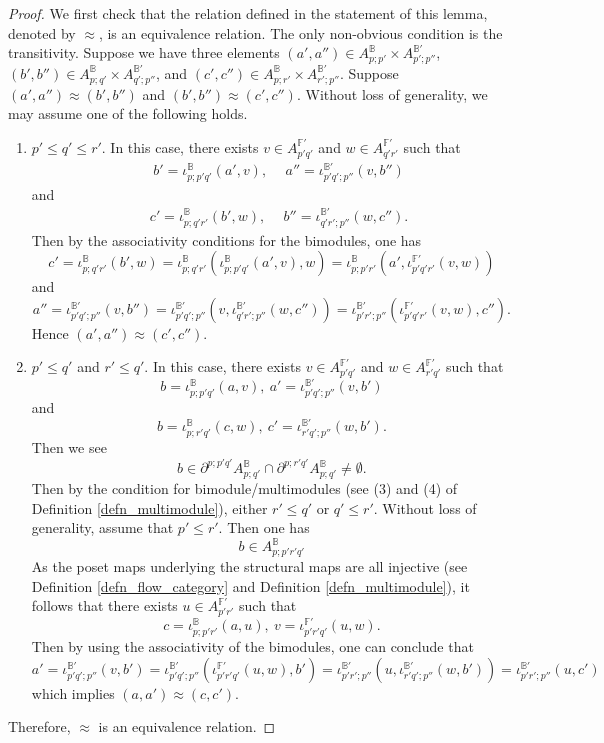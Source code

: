 \documentclass[reqno, 10pt]{amsart}
\numberwithin{equation}{section}
\numberwithin{equation}{section}
\theoremstyle{definition}
\theoremstyle{remark}
\newcommand{\beqn}{\begin{equation*}}
\newcommand{\eeqn}{\end{equation*}}
\newcommand{\mb}{\mathbb}
\begin{document}
\begin{proof}
    
We first check that the relation defined in the statement of this lemma, denoted by $\approx$, is an equivalence relation. The only non-obvious condition is the transitivity. Suppose we have three elements $(a', a'') \in A_{p; p'}^{\mb B} \times A_{p'; p''}^{{\mb B}'}$, $(b', b'') \in A_{p; q'}^{\mb B} \times A_{q'; p''}^{{\mb B}'}$, and $(c', c'') \in A_{p; r'}^{\mb B} \times A_{r'; p''}^{{\mb B}'}$. Suppose $(a', a'') \approx (b', b'')$ and $(b', b'') \approx (c', c'')$. Without loss of generality, we may assume one of the following holds.
\begin{enumerate}

\item $p' \leq q' \leq r'$. In this case, there exists $v \in A_{p' q'}^{{\mb F}'}$ and $w \in A_{q'r'}^{{\mb F}'}$ such that 
\begin{align*}
&\ b' = \iota_{p; p'q'}^{{\mb B}}(a', v),\ &\ a'' = \iota_{p'q'; p''}^{{\mb B}'}(v, b'')
\end{align*}
and 
\begin{align*}
&\ c' = \iota_{p; q'r'}^{{\mb B}}(b', w),\ &\ b'' = \iota_{q'r'; p''}^{{\mb B}'}(w, c'').
\end{align*}
Then by the associativity conditions for the bimodules, one has
\beqn
c' = \iota_{p; q'r'}^{\mb B}(b', w) = \iota_{p; q'r'}^{{\mb B}}(\iota_{p; p'q'}^{{\mb B}}(a', v), w) = \iota_{p; p'r'}^{{\mb B}} (a', \iota_{p'q'r'}^{{\mb F}'}(v, w))
\eeqn
and
\beqn
a'' = \iota_{p'q'; p''}^{{\mb B}'}(v, b'') = \iota_{p'q'; p''}^{{\mb B}'}(v, \iota_{q'r'; p''}^{{\mb B}'}(w, c'')) = \iota_{p'r'; p''}^{{\mb B}'}( \iota_{p'q'r'}^{{\mb F}'}(v, w), c'').
\eeqn
Hence $(a', a'') \approx (c',c'')$.

\item $p' \leq q'$ and $r' \leq q'$. In this case, there exists $v \in A_{p'q'}^{{\mb F}'}$ and $w\in A_{r'q'}^{{\mb F}'}$ such that 
\beqn
b = \iota_{p; p'q'}^{{\mb B}}(a, v),\ a' = \iota_{p'q'; p''}^{{\mb B}'}(v, b')
\eeqn
and
\beqn
b = \iota_{p; r'q'}^{{\mb B}}(c, w),\ c' = \iota_{r'q'; p''}^{{\mb B}'}(w, b').
\eeqn
Then we see 
\beqn
b \in \partial^{p; p'q'} A_{p;q'}^{{\mb B}} \cap \partial^{p; r'q'} A_{p; q'}^{{\mb B}} \neq \emptyset.
\eeqn
Then by the condition for bimodule/multimodules (see (3) and (4) of Definition \ref{defn_multimodule}), either $r' \leq q'$ or $q' \leq r'$. Without loss of generality, assume that $p' \leq r'$. Then one has
\beqn
b  \in A_{p;p'r'q'}^{\mb B}
\eeqn
As the poset maps underlying the structural maps are all injective (see Definition \ref{defn_flow_category} and Definition \ref{defn_multimodule}), it follows that there exists $u \in A_{p'r'}^{{\mb F}'}$ such that 
\beqn
c = \iota_{p; p'r'}^{{\mb B}}(a, u),\ v = \iota_{p'r'q'}^{{\mb F}'}(u, w). 
\eeqn
Then by using the associativity of the bimodules, one can conclude that
\beqn
a' = \iota_{p'q'; p''}^{{\mb B}'} (v, b') = \iota_{p'q'; p''}^{{\mb B}'} (\iota_{p'r'q'}^{{\mb F}'}(u, w), b') = \iota_{p'r'; p''}^{{\mb B}'}(u, \iota_{r'q'; p''}^{{\mb B}'}(w, b')) = \iota_{p'r'; p''}^{{\mb B}'}(u, c')
\eeqn
which implies $(a, a') \approx (c,c')$.
\end{enumerate}
Therefore, $\approx$ is an equivalence relation. 


\end{proof}
\end{document}

